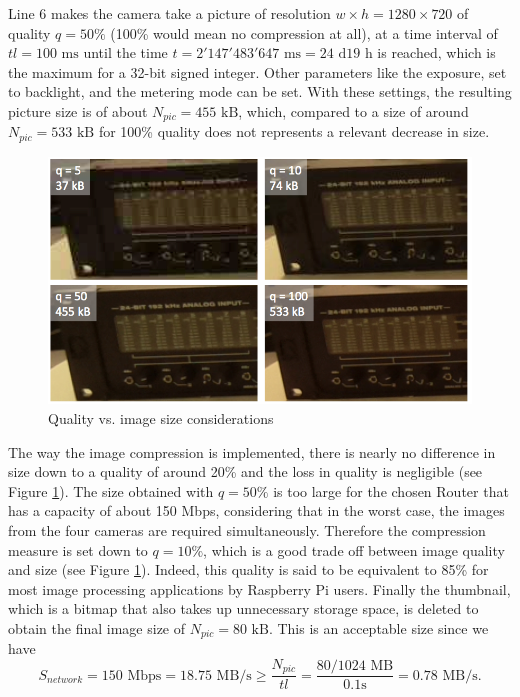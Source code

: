 Line 6 makes the camera take a picture of resolution $w \times h = 1280 \times 720$ of quality $q=50\%$ (100\% would mean no compression at all), at a time interval of $tl = 100 \text{ ms}$ until the time $t = 2'147'483'647 \text{ ms} = 24 \text{ d} 19 \text{ h}$ is reached, which is the maximum for a 32-bit signed integer.
Other parameters like the exposure, set to backlight, and the metering mode can be set. 
With these settings, the resulting picture size is of about $N_{pic}=455\text{ kB}$, which, compared to a size of around $N_{pic}=533 \text{ kB}$ for 100\% quality does not represents a relevant decrease in size. 
\begin{figure}[htb]
    \centering
    \includegraphics[width=.8\linewidth]{files/quality.png}
    \caption{Quality vs. image size considerations}
    \label{fig:quality}
\end{figure}
The way the image compression is implemented, there is nearly no difference in size down to a quality of around 20\% and the loss in quality is negligible (see Figure \ref{fig:quality}).
The size obtained with $q=50\%$ is too large for the chosen Router that has a capacity of about 150 Mbps, considering that in the worst case, the images from the four cameras are required simultaneously. 
Therefore the compression measure is set down to $q=10\%$, which is a good trade off between image quality and size (see Figure \ref{fig:quality}). 
Indeed, this quality is said to be equivalent to 85\% for most image processing applications by Raspberry Pi users. %
Finally the thumbnail, which is a bitmap that also takes up unnecessary storage space, is deleted to obtain the final image size of $N_{pic}=80 \text{ kB}$. This is an acceptable size since we have
\begin{equation}
    S_{network} = 150 \text{ Mbps} = 18.75 \text{ MB/s} \geq \frac{N_{pic}}{tl}  = \frac{80/1024 \text{ MB}}{0.1\text{s}}= 0.78 \text{ MB/s}.
\end{equation}

